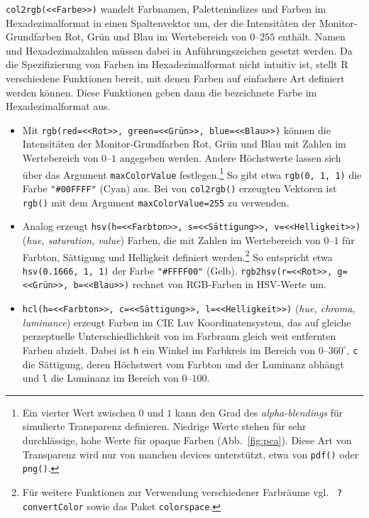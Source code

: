 \lstinline!col2rgb(<<Farbe>>)! wandelt Farbnamen, Palettenindizes und Farben im Hexadezimalformat in einen Spaltenvektor um, der die Intensitäten der Monitor-Grundfarben Rot, Grün und Blau im Wertebereich von $0$--$255$ enthält. Namen und Hexadezimalzahlen müssen dabei in Anführungszeichen gesetzt werden. Da die Spezifizierung von Farben im Hexadezimalformat nicht intuitiv ist, stellt R verschiedene Funktionen bereit, mit denen Farben auf einfachere Art definiert werden können. Diese Funktionen geben dann die bezeichnete Farbe im Hexadezimalformat aus.

\begin{itemize}
\item Mit \lstinline!rgb(red=<<Rot>>, green=<<Grün>>, blue=<<Blau>>)! können die Intensitäten der Monitor-Grundfarben Rot, Grün und Blau mit Zahlen im Wertebereich von $0$--$1$ angegeben werden. Andere Höchstwerte lassen sich über das Argument \lstinline!maxColorValue! festlegen.\footnote{\label{ftn:transp}Ein vierter Wert zwischen $0$ und $1$ kann den Grad des \emph{alpha-blendings} für simulierte Transparenz definieren. Niedrige Werte stehen für sehr durchlässige, hohe Werte für opaque Farben (Abb.\ \ref{fig:pca}). Diese Art von Transparenz wird nur von manchen devices unterstützt, etwa von \lstinline!pdf()! oder \lstinline!png()!.} So gibt etwa \lstinline!rgb(0, 1, 1)! die Farbe \lstinline!"#00FFFF"! (Cyan) aus. Bei von \lstinline!col2rgb()! erzeugten Vektoren ist \lstinline!rgb()! mit dem Argument \lstinline!maxColorValue=255! zu verwenden.
\item Analog erzeugt \lstinline!hsv(h=<<Farbton>>, s=<<Sättigung>>, v=<<Helligkeit>>)! (\emph{hue, saturation, value}) Farben, die mit Zahlen im Wertebereich von $0$--$1$ für Farbton, Sättigung und Helligkeit definiert werden.\footnote{Für weitere Funktionen zur Verwendung verschiedener Farbräume vgl.\   \lstinline!?convertColor! sowie das Paket \lstinline!colorspace!.} So entspricht etwa \lstinline!hsv(0.1666, 1, 1)! der Farbe \lstinline!"#FFFF00"! (Gelb). \lstinline!rgb2hsv(r=<<Rot>>, g=<<Grün>>, b=<<Blau>>)! rechnet von RGB-Farben in HSV-Werte um.
\item \lstinline!hcl(h=<<Farbton>>, c=<<Sättigung>>, l=<<Helligkeit>>)! (\emph{hue, chroma, luminance}) erzeugt Farben im CIE Luv Koordinatensystem, das auf gleiche perzeptuelle Unterschiedlichkeit von im Farbraum gleich weit entfernten Farben abzielt. Dabei ist \lstinline!h! ein Winkel im Farbkreis im Bereich von $0$--$360^{\circ}$, \lstinline!c! die Sättigung, deren Höchstwert vom Farbton und der Luminanz abhängt und \lstinline!l! die Luminanz im Bereich von $0$--$100$.

\end{itemize}

